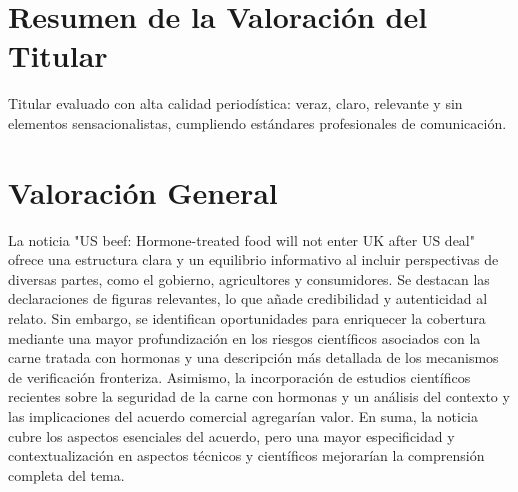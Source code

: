 \documentclass[10pt,a4paper]{article}
\begin{document}
\section*{Resumen de la Valoración del Titular}
    Titular evaluado con alta calidad period\'{i}stica: veraz, claro, relevante y sin elementos sensacionalistas, cumpliendo est\'{a}ndares profesionales de comunicaci\'{o}n.
\vspace{1em}

\section*{Valoración General}
    La noticia "US beef: Hormone-treated food will not enter UK after US deal" ofrece una estructura clara y un equilibrio informativo al incluir perspectivas de diversas partes, como el gobierno, agricultores y consumidores. Se destacan las declaraciones de figuras relevantes, lo que a\~{n}ade credibilidad y autenticidad al relato. Sin embargo, se identifican oportunidades para enriquecer la cobertura mediante una mayor profundizaci\'{o}n en los riesgos cient\'{i}ficos asociados con la carne tratada con hormonas y una descripci\'{o}n m\'{a}s detallada de los mecanismos de verificaci\'{o}n fronteriza. Asimismo, la incorporaci\'{o}n de estudios cient\'{i}ficos recientes sobre la seguridad de la carne con hormonas y un an\'{a}lisis del contexto y las implicaciones del acuerdo comercial agregar\'{i}an valor. En suma, la noticia cubre los aspectos esenciales del acuerdo, pero una mayor especificidad y contextualizaci\'{o}n en aspectos t\'{e}cnicos y cient\'{i}ficos mejorar\'{i}an la comprensi\'{o}n completa del tema.
\vspace{1em}

\end{document}

